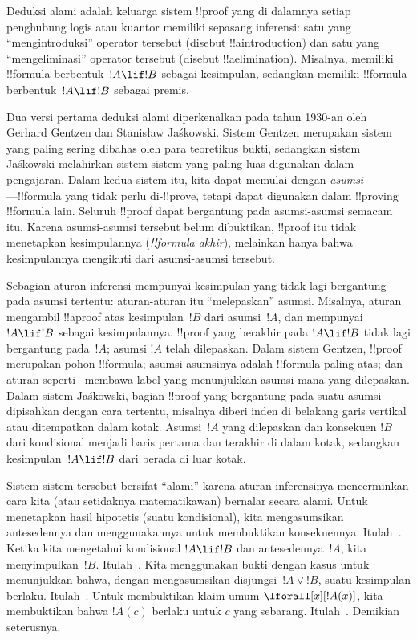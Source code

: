 \documentclass[../../../include/open-logic-section]{subfiles}
\begin{document}


Deduksi alami adalah keluarga sistem !!{proof} yang di dalamnya setiap
penghubung logis atau kuantor memiliki sepasang inferensi: satu yang
``mengintroduksi'' operator tersebut (disebut !!a{introduction}) dan satu
yang ``mengeliminasi'' operator tersebut (disebut !!a{elimination}).
Misalnya, \Intro{\lif} memiliki !!{formula} berbentuk~$!A \lif !B$ sebagai
kesimpulan, sedangkan \Elim{\lif} memiliki !!{formula} berbentuk~$!A \lif
!B$ sebagai premis.

Dua versi pertama deduksi alami diperkenalkan pada tahun 1930-an oleh
Gerhard Gentzen dan Stanisław Jaśkowski. Sistem Gentzen merupakan sistem
yang paling sering dibahas oleh para teoretikus bukti, sedangkan sistem
Jaśkowski melahirkan sistem-sistem yang paling luas digunakan dalam
pengajaran. Dalam kedua sistem itu, kita dapat memulai dengan
\emph{asumsi}---!!{formula} yang tidak perlu di-!!{prove}, tetapi dapat
digunakan dalam !!{proving} !!{formula} lain. Seluruh !!{proof} dapat
bergantung pada asumsi-asumsi semacam itu. Karena asumsi-asumsi tersebut
belum dibuktikan, !!{proof} itu tidak menetapkan kesimpulannya
(\emph{!!{formula} akhir}), melainkan hanya bahwa kesimpulannya mengikuti
dari asumsi-asumsi tersebut.

Sebagian aturan inferensi mempunyai kesimpulan yang tidak lagi bergantung
pada asumsi tertentu: aturan-aturan itu ``melepaskan'' asumsi.
Misalnya, aturan \Intro{\lif} mengambil !!a{proof} atas kesimpulan~$!B$
dari asumsi~$!A$, dan mempunyai $!A \lif !B$ sebagai kesimpulannya.
!!{proof} yang berakhir pada $!A \lif !B$ tidak lagi bergantung
pada~$!A$; asumsi $!A$ telah dilepaskan. Dalam sistem Gentzen,
!!{proof} merupakan pohon !!{formula}; asumsi-asumsinya adalah
!!{formula} paling atas; dan aturan seperti~\Intro{\lif} membawa label
yang menunjukkan asumsi mana yang dilepaskan. Dalam sistem Jaśkowski,
bagian !!{proof} yang bergantung pada suatu asumsi dipisahkan dengan cara
tertentu, misalnya diberi inden di belakang garis vertikal atau ditempatkan
dalam kotak. Asumsi~$!A$ yang dilepaskan dan konsekuen $!B$ dari
kondisional menjadi baris pertama dan terakhir di dalam kotak, sedangkan
kesimpulan~$!A \lif !B$ dari \Intro{\lif} berada di luar kotak.

Sistem-sistem tersebut bersifat ``alami'' karena aturan inferensinya
mencerminkan cara kita (atau setidaknya matematikawan) bernalar secara
alami. Untuk menetapkan hasil hipotetis (suatu kondisional), kita
mengasumsikan antesedennya dan menggunakannya untuk membuktikan
konsekuennya. Itulah~\Intro{\lif}. Ketika kita mengetahui kondisional
$!A \lif !B$ dan antesedennya~$!A$, kita menyimpulkan~$!B$.
Itulah~\Elim{\lif}. Kita menggunakan bukti dengan kasus untuk menunjukkan
bahwa, dengan mengasumsikan disjungsi~$!A \lor !B$, suatu kesimpulan
berlaku. Itulah~\Elim{\lor}. Untuk membuktikan klaim umum
$\lforall[x][!A(x)]$, kita membuktikan bahwa $!A(c)$ berlaku untuk
$c$ yang sebarang. Itulah~\Intro{\lforall}. Demikian seterusnya.
\end{document}
